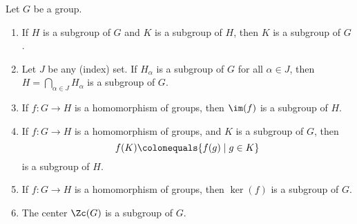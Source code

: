 \begin{lemma}\label{subgroups examples}
Let $G$ be a group.
\vspace{-0.3em}
\begin{enumerate}[leftmargin=20pt,itemsep=-0.1em,label=(\alph*)]
\item If $H$ is a subgroup of $G$ and $K$ is a subgroup of $H$, then $K$ is a subgroup of $G$. 
\item Let $J$ be any (index) set. If $H_\alpha$ is a subgroup of $G$ for all $\alpha \in J$, then $H=\bigcap_{\alpha\in J} H_\alpha$ is a subgroup of $G$.
 \item If $f: G \to H$ is a homomorphism of groups, then $\im(f)$ is a subgroup of $H$.
 \item If $f: G \to H$ is a homomorphism of groups, and $K$ is a subgroup of $G$, then 
 $$f(K) \colonequals \{ f(g) \mid g \in K \}$$
is a subgroup of $H$.
 \item If $f: G \to H$ is a homomorphism of groups, then $\ker(f)$ is a subgroup of $G$.
 \item The center $\Zc(G)$ is a subgroup of $G$.
\end{enumerate}
\end{lemma}


